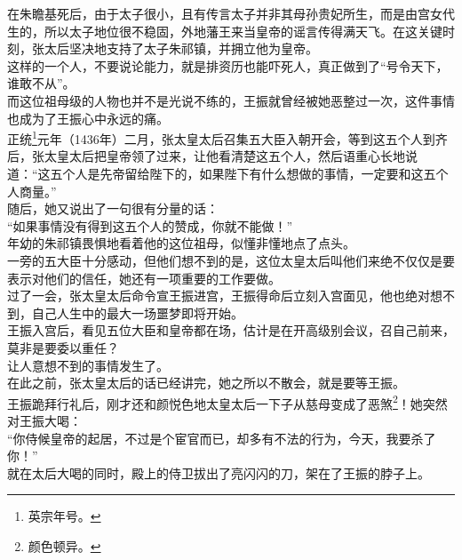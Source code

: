 \begin{multicols}{\theparacolNo}
在朱瞻基死后，由于太子很小，且有传言太子并非其母孙贵妃所生，而是由宫女代生的，所以太子地位很不稳固，外地藩王来当皇帝的谣言传得满天飞。在这关键时刻，张太后坚决地支持了太子朱祁镇，并拥立他为皇帝。\\

这样的一个人，不要说论能力，就是排资历也能吓死人，真正做到了“号令天下，谁敢不从”。\\

而这位祖母级的人物也并不是光说不练的，王振就曾经被她恶整过一次，这件事情也成为了王振心中永远的痛。\\

正统\footnote{英宗年号。}元年（1436年）二月，张太皇太后召集五大臣入朝开会，等到这五个人到齐后，张太皇太后把皇帝领了过来，让他看清楚这五个人，然后语重心长地说道：“这五个人是先帝留给陛下的，如果陛下有什么想做的事情，一定要和这五个人商量。”\\

随后，她又说出了一句很有分量的话：\\

“如果事情没有得到这五个人的赞成，你就不能做！”\\

年幼的朱祁镇畏惧地看着他的这位祖母，似懂非懂地点了点头。\\

一旁的五大臣十分感动，但他们想不到的是，这位太皇太后叫他们来绝不仅仅是要表示对他们的信任，她还有一项重要的工作要做。\\

过了一会，张太皇太后命令宣王振进宫，王振得命后立刻入宫面见，他也绝对想不到，自己人生中的最大一场噩梦即将开始。\\

王振入宫后，看见五位大臣和皇帝都在场，估计是在开高级别会议，召自己前来，莫非是要委以重任？\\

让人意想不到的事情发生了。\\

在此之前，张太皇太后的话已经讲完，她之所以不散会，就是要等王振。\\

王振跪拜行礼后，刚才还和颜悦色地太皇太后一下子从慈母变成了恶煞\footnote{颜色顿异。}！她突然对王振大喝：\\

“你侍候皇帝的起居，不过是个宦官而已，却多有不法的行为，今天，我要杀了你！”\\

就在太后大喝的同时，殿上的侍卫拔出了亮闪闪的刀，架在了王振的脖子上。\\


\end{multicols}

